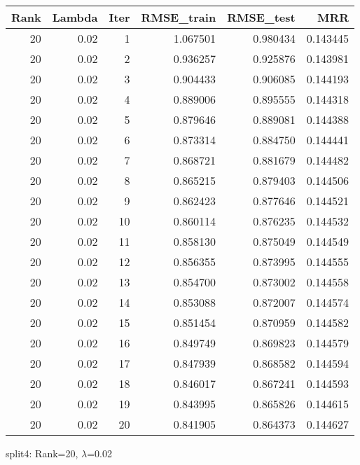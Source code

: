 \begin{tabular}{rrrrrr}
\toprule
 Rank &  Lambda &  Iter &  RMSE\_train &  RMSE\_test &       MRR \\
\midrule
   20 &    0.02 &     1 &    1.067501 &   0.980434 &  0.143445 \\
   20 &    0.02 &     2 &    0.936257 &   0.925876 &  0.143981 \\
   20 &    0.02 &     3 &    0.904433 &   0.906085 &  0.144193 \\
   20 &    0.02 &     4 &    0.889006 &   0.895555 &  0.144318 \\
   20 &    0.02 &     5 &    0.879646 &   0.889081 &  0.144388 \\
   20 &    0.02 &     6 &    0.873314 &   0.884750 &  0.144441 \\
   20 &    0.02 &     7 &    0.868721 &   0.881679 &  0.144482 \\
   20 &    0.02 &     8 &    0.865215 &   0.879403 &  0.144506 \\
   20 &    0.02 &     9 &    0.862423 &   0.877646 &  0.144521 \\
   20 &    0.02 &    10 &    0.860114 &   0.876235 &  0.144532 \\
   20 &    0.02 &    11 &    0.858130 &   0.875049 &  0.144549 \\
   20 &    0.02 &    12 &    0.856355 &   0.873995 &  0.144555 \\
   20 &    0.02 &    13 &    0.854700 &   0.873002 &  0.144558 \\
   20 &    0.02 &    14 &    0.853088 &   0.872007 &  0.144574 \\
   20 &    0.02 &    15 &    0.851454 &   0.870959 &  0.144582 \\
   20 &    0.02 &    16 &    0.849749 &   0.869823 &  0.144579 \\
   20 &    0.02 &    17 &    0.847939 &   0.868582 &  0.144594 \\
   20 &    0.02 &    18 &    0.846017 &   0.867241 &  0.144593 \\
   20 &    0.02 &    19 &    0.843995 &   0.865826 &  0.144615 \\
   20 &    0.02 &    20 &    0.841905 &   0.864373 &  0.144627 \\
\bottomrule
\end{tabular}

\caption{split4: Rank=20, $\lambda$=0.02}
